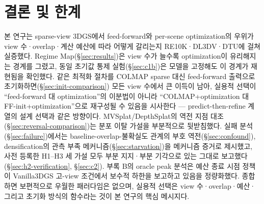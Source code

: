 \section{결론 및 한계}
\label{sec:conclusion}

본 연구는 sparse-view 3DGS에서 feed-forward와 per-scene optimization의 우위가 view 수·overlap·계산 예산에 따라 어떻게 갈리는지 RE10K·DL3DV·DTU에 걸쳐 실증했다. Regime Map(\S\ref{sec:results})은 view 수가 늘수록 optimization이 유리해지는 경계를 그렸고, 동일 초기값 통제 실험(\S\ref{sec:c1b})은 모델을 고정해도 이 경계가 재현됨을 확인했다. 같은 최적화 절차를 COLMAP sparse 대신 feed-forward 출력으로 초기화하면(\S\ref{sec:init-comparison}) 모든 view 수에서 큰 이득이 남아, 실용적 선택이 ``feed-forward 대 optimization''의 이분법이 아니라 ``COLMAP+optimization 대 FF-init+optimization''으로 재구성될 수 있음을 시사한다 — predict-then-refine 계열의 설계 선택과 같은 방향이다. MVSplat/DepthSplat의 역전 지점 대조(\S\ref{sec:reversal-comparison})는 분포 이탈 가설을 부분적으로 뒷받침했다. 실패 분석(\S\ref{sec:failure})에서는 baseline-overlap-불확실도 관계의 부호 역전(\S\ref{sec:confound}), densification의 관측 부족 메커니즘(\S\ref{sec:starvation})을 메커니즘 증거로 제시했고, 사전 등록한 H1--H3 세 가설 모두 부분 지지·부분 기각으로 있는 그대로 보고했다(\S\ref{sec:h2-verification}, \S\ref{sec:c2}). 부록 B의 oracle peak 분석은 예산 종료 시점 정책이 Vanilla3DGS 고-view 조건에서 보수적 하한을 보고하고 있음을 정량화했다. 종합하면 보편적으로 우월한 패러다임은 없으며, 실용적 선택은 view 수·overlap·예산·그리고 초기화 방식의 함수라는 것이 본 연구의 핵심 메시지다.

